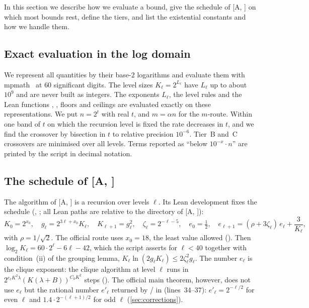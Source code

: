 \documentclass[10pt]{amsart}
\theoremstyle{definition}
\theoremstyle{remark}
\numberwithin{equation}{section}
\newcommand{\A}[1][]{\textup{[A\if\relax\detokenize{#1}\relax\else, #1\fi]}}
\begin{document}
In this section we describe how we evaluate a bound, give the schedule of \A{} on which most bounds
rest, define the tiers, and list the existential constants and how we handle them.

\subsection{Exact evaluation in the log domain}\label{sec:logdomain}
We represent all quantities by their base-$2$ logarithms and evaluate them with
mpmath~\cite{mpmath} at $60$ significant digits. The level sizes $K_\ell=2^{L_\ell}$ have
$L_\ell$ up to about $10^{9}$ and are never built as integers. The exponents $L_\ell$, the level
rules and the Lean functions , , floors and ceilings are evaluated
exactly on these representations. We put $n=2^t$ with real $t$, and $m=\alpha n$ for the
$m$-route. Within one band of $t$ on which the recursion level is fixed the rate decreases in $t$,
and we find the crossover by bisection in $t$ to relative precision $10^{-6}$. Tier~B and~C
crossovers are minimised over all levels. Terms reported as ``below $10^{-x}\cdot n$'' are
printed by the script in decimal notation.

\subsection{The schedule of \texorpdfstring{\A}{[A]}}\label{sec:schedule}
The algorithm of \A{} is a recursion over levels $\ell$. Its Lean development fixes the schedule
(, ; all Lean paths are relative to the
 directory of \A):
\begin{equation}\label{eq:schedule}
K_0=2^{x_0},\quad g_\ell=2^{3\ell+x_0}K_\ell,\quad K_{\ell+1}=g_\ell^2,\quad \zeta_\ell=2^{-\ell-5},\quad
e_0=\tfrac12,\quad e_{\ell+1}=(\rho+3\zeta_\ell)\,e_\ell+\frac{3}{K_\ell},
\end{equation}
with $\rho=1/\sqrt2$. The official route uses $x_0=18$, the least value allowed
(). Then $\log_2K_\ell=60\cdot2^\ell-6\ell-42$, which the
script asserts for $\ell<40$ together with condition~(ii) of the grouping lemma,
$K_\ell\ln(2g_\ell K_\ell)\le2\zeta_\ell^2g_\ell$. The number $e_\ell$ is the clique exponent: the
clique algorithm at level $\ell$ runs in $2^{e_\ell K^2\lambda}(K(\lambda+B))^{C_0K^2}$ steps
(). The official main theorem, however, does not use
$e_\ell$ but the rational number $e'_\ell$ returned by / in
 (lines~34--37): $e'_\ell=2^{-\ell/2}$ for even $\ell$
and $1.4\cdot2^{-(\ell+1)/2}$ for odd $\ell$ (\cref{sec:corrections}).
\end{document}
